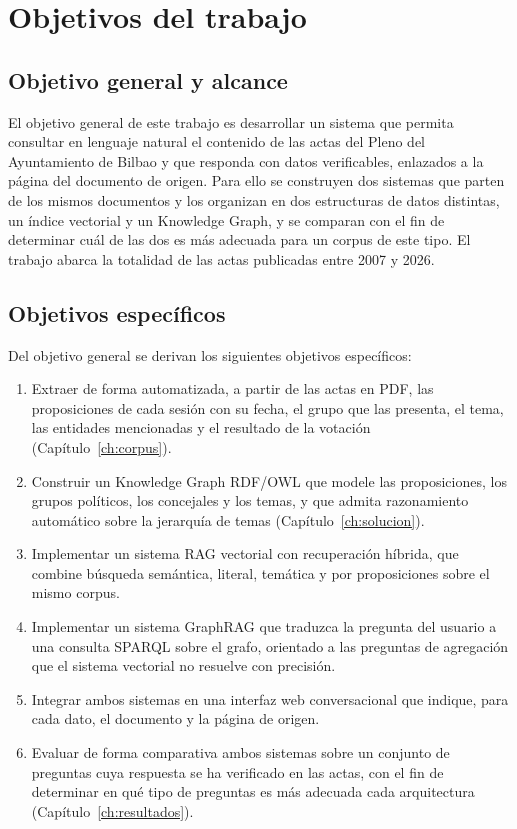 \documentclass[11pt, a4paper]{report}
\begin{document}
	\section{Objetivos del trabajo}

	\subsection{Objetivo general y alcance}
	\label{sec:alcance}

	El objetivo general de este trabajo es desarrollar un sistema que permita
	consultar en lenguaje natural el contenido de las actas del Pleno del
	Ayuntamiento de Bilbao y que responda con datos verificables, enlazados a la
	página del documento de origen. Para ello se construyen dos sistemas que
	parten de los mismos documentos y los organizan en dos estructuras de datos
	distintas, un índice vectorial y un Knowledge Graph, y se comparan con el fin
	de determinar cuál de las dos es más adecuada para un corpus de este tipo. El
	trabajo abarca la totalidad de las actas publicadas entre 2007 y 2026.

	\subsection{Objetivos específicos}
	\label{sec:objetivos-especificos}

	Del objetivo general se derivan los siguientes objetivos específicos:

	\begin{enumerate}
		\item Extraer de forma automatizada, a partir de las actas en PDF, las
		proposiciones de cada sesión con su fecha, el grupo que las presenta, el
		tema, las entidades mencionadas y el resultado de la votación
		(Capítulo~\ref{ch:corpus}).
		\item Construir un Knowledge Graph RDF/OWL que modele las
		proposiciones, los grupos políticos, los concejales y los temas, y que
		admita razonamiento automático sobre la jerarquía de temas
		(Capítulo~\ref{ch:solucion}).
		\item Implementar un sistema RAG vectorial con recuperación híbrida, que
		combine búsqueda semántica, literal, temática y por proposiciones sobre
		el mismo corpus.
		\item Implementar un sistema GraphRAG que traduzca la pregunta del usuario
		a una consulta SPARQL sobre el grafo, orientado a las preguntas de
		agregación que el sistema vectorial no resuelve con precisión.
		\item Integrar ambos sistemas en una interfaz web conversacional que
		indique, para cada dato, el documento y la página de origen.
		\item Evaluar de forma comparativa ambos sistemas sobre un conjunto de
		preguntas cuya respuesta se ha verificado en las actas, con el fin de
		determinar en qué tipo de preguntas es más adecuada cada arquitectura
		(Capítulo~\ref{ch:resultados}).
	\end{enumerate}
\end{document}
